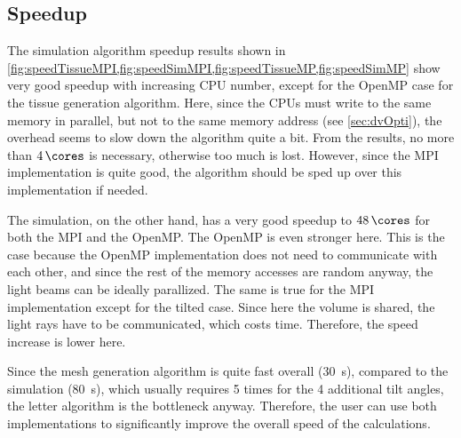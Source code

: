\subsection{Speedup}
%
The simulation algorithm speedup results shown in \cref{fig:speedTissueMPI,fig:speedSimMPI,fig:speedTissueMP,fig:speedSimMP} show very good speedup with increasing \ac{CPU} number, except for the \ac{OpenMP} case for the tissue generation algorithm.
Here, since the \acsp{CPU} must write to the same memory in parallel, but not to the same memory address (see \cref{sec:dvOpti}), the overhead seems to slow down the algorithm quite a bit.
From the results, no more than $\SI{4}{\cores}$ is necessary, otherwise too much \dummy{} is lost.
However, since the \ac{MPI} implementation is quite good, the algorithm should be sped up over this implementation if needed.
\par
%
The simulation, on the other hand, has a very good speedup to $\SI{48}{\cores}$ for both the \ac{MPI} and the \ac{OpenMP}.
The \ac{OpenMP} is even stronger here.
This is the case because the \ac{OpenMP} implementation does not need to communicate with each other, and since the rest of the memory accesses are random anyway, the light beams can be ideally parallized.
The same is true for the \ac{MPI} implementation except for the tilted case.
Since here the volume is shared, the light rays have to be communicated, which costs time.
Therefore, the speed increase is lower here.
\par
%
Since the mesh generation algorithm is quite fast overall (\SI{30}{\second}), compared to the simulation (\SI{80}{\second}), which usually requires 5 times for the 4 additional tilt angles, the letter algorithm is the bottleneck anyway.
Therefore, the user can use both implementations to significantly improve the overall speed of the calculations.